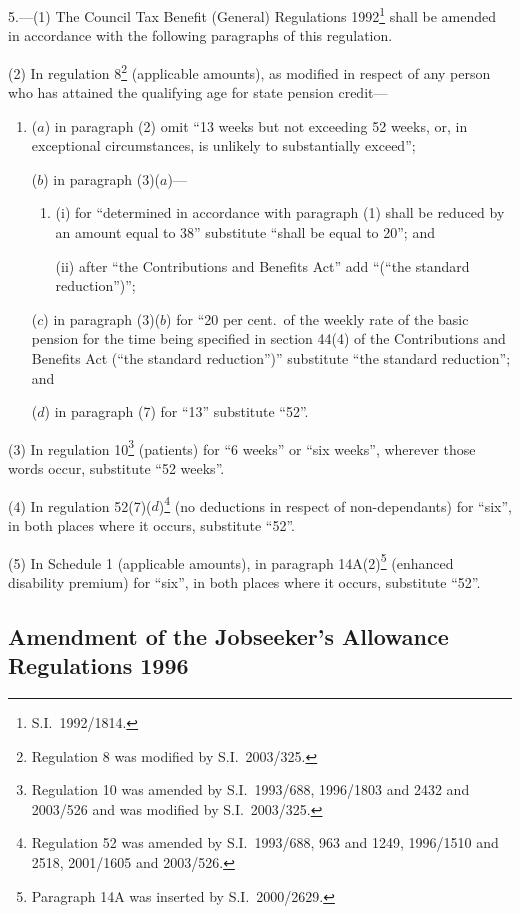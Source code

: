 \documentclass[12pt,a4paper]{article}
\begin{document}
5.---(1)  The Council Tax Benefit (General) Regulations 1992\footnote{S.I.\ 1992/1814.} shall be amended in accordance with the following paragraphs of this regulation.

(2) In regulation 8\footnote{Regulation 8 was modified by S.I.\ 2003/325.} (applicable amounts), as modified in respect of any person who has attained the qualifying age for state pension credit—
\begin{enumerate}\item[]
($a$) in paragraph (2) omit “13 weeks but not exceeding 52 weeks, or, in exceptional circumstances, is unlikely to substantially exceed”;

($b$) in paragraph (3)($a$)—
\begin{enumerate}\item[]
(i) for “determined in accordance with paragraph (1) shall be reduced by an amount equal to 38” substitute “shall be equal to 20”; and

(ii) after “the Contributions and Benefits Act” add “(“the standard reduction”)”;
\end{enumerate}

($c$) in paragraph (3)($b$)  for “20 per cent.\ of the weekly rate of the basic pension for the time being specified in section 44(4) of the Contributions and Benefits Act (“the standard reduction”)” substitute “the standard reduction”; and

($d$) in paragraph (7) for “13” substitute “52”.
\end{enumerate}

(3) In regulation 10\footnote{Regulation 10 was amended by S.I.\ 1993/688, 1996/1803 and 2432 and 2003/526 and was modified by S.I.\ 2003/325.} (patients) for “6 weeks” or “six weeks”, wherever those words occur, substitute “52 weeks”.

(4) In regulation 52(7)($d$)\footnote{Regulation 52 was amended by S.I.\ 1993/688, 963 and 1249, 1996/1510 and 2518, 2001/1605 and 2003/526.} (no deductions in respect of non-dependants) for “six”, in both places where it occurs, substitute “52”.

(5) In Schedule 1 (applicable amounts), in paragraph 14A(2)\footnote{Paragraph 14A was inserted by S.I.\ 2000/2629.} (enhanced disability premium) for “six”, in both places where it occurs, substitute “52”.

\subsection[6. Amendment of the Jobseeker’s Allowance Regulations 1996]{Amendment of the Jobseeker’s Allowance Regulations 1996}
\end{document}
